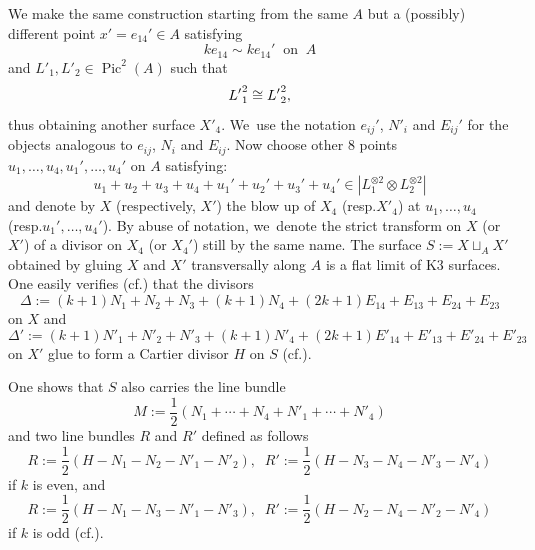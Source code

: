 \documentclass[11pt]{article}
\newcommand{\cf}{cf.\xspace}
\newcommand{\resp}{resp.\xspace}
\theoremstyle{plain}
\theoremstyle{definition}
\DeclareMathOperator{\Pic}{Pic}
\begin{document}
\begin{center}
\end{center}

We make the same construction starting from the same $A$ but a (possibly) different point $x'=e_{14}'\in A$ satisfying
\begin{equation}\label{drei}
ke_{14} \sim ke_{14}' \;
\; \mbox{on} \; \; A
\end{equation}
and $L'_1, L'_2 \in \Pic^2(A)$ such that
\begin{equation}\label{zwei}{L'}_1^{\*2} \cong {L'}_2^{\*2},\end{equation}
thus obtaining another surface $X'_4$. We~use the notation $e_{ij}'$,
$N'_i$ and $E_{ij}'$ for the objects analogous to $e_{ij}$,
$N_i$ and $E_{ij}$.
Now choose other $8$ points $u_{1},\ldots,u_{4}, u_{1}',\ldots,u_{4}'$ on $A$
satisfying:
\[
u_1+u_2+u_3+u_4+u_1'+u_2'+u_3'+u_4'\in |L_1^{\otimes2}\otimes L_2^{\otimes 2}|
\]
and denote by $X$ (respectively, $X'$) the blow up of $X_4$ (\resp $X'_4$) at $u_{1},\ldots,u_{4}$ (\resp $u_{1}',\ldots,u_{4}'$). By abuse of notation, we~denote the strict transform on $X$ (or~$X'$) of a divisor on $X_4$ (or $X_4'$) still by the same name. The surface $S:= X \sqcup_{A} X'$ obtained by gluing $X$ and $X'$ transversally along $A$ is a flat limit of K3 surfaces.
One easily verifies (\cf \cite[Lem.\,5.1]{KLV1}) that the divisors
\[
 \Delta:= (k+1)N_1+N_2+N_3+(k+1)N_4+(2k+1)E_{14}+E_{13}+E_{24}+E_{23}
\]
on $X$ and
\[
 \Delta':=(k+1)N'_1+N'_2+N'_3+(k+1)N'_4+(2k+1)E'_{14}+E'_{13}+E'_{24}+E'_{23}
\]
on $X'$ glue to form a Cartier divisor $H$ on $S$ (\cf \cite[(35)]{KLV1}).

One shows that $S$ also carries the line bundle
\[
 M:=\frac{1}{2}\left(N_1+\cdots+N_4+N'_1+\cdots+N'_4\right)
\]
and two line bundles $R$ and $R'$ defined as follows
\begin{equation}
\label{eq:keven}
R:=\frac{1}{2}\left(H-N_1-N_2-N'_1-N'_2\right), \; \; R':=\frac{1}{2}\left(H-N_3-N_4-N'_3-N'_4\right)
\end{equation}
if $k$ is even, and
\begin{equation}\label{eq:kodd}
R:=\frac{1}{2}\left(H-N_1-N_3-N'_1-N'_3\right), \; \; R':=\frac{1}{2}\left(H-N_2-N_4-N'_2-N'_4\right)
\end{equation}
if $k$ is odd (\cf \cite[p.\,26]{KLV1}).
\end{document}
